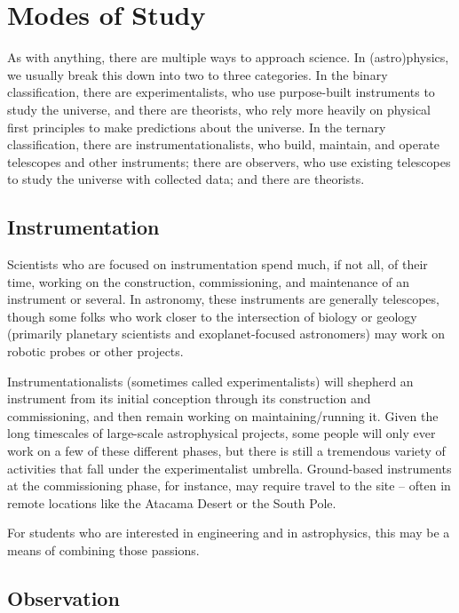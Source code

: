 \section{Modes of Study}

As with anything, there are multiple ways to approach science. In (astro)physics, we usually break this down into two to three categories. In the binary classification, there are experimentalists, who use purpose-built instruments to study the universe, and there are theorists, who rely more heavily on physical first principles to make predictions about the universe. In the ternary classification, there are instrumentationalists, who build, maintain, and operate telescopes and other instruments; there are observers, who use existing telescopes to study the universe with collected data; and there are theorists.

\subsection{Instrumentation}

Scientists who are focused on instrumentation spend much, if not all, of their time, working on the construction, commissioning, and maintenance of an instrument or several. In astronomy, these instruments are generally telescopes, though some folks who work closer to the intersection of biology or geology (primarily planetary scientists and exoplanet-focused astronomers) may work on robotic probes or other projects.

Instrumentationalists (sometimes called experimentalists) will shepherd an instrument from its initial conception through its construction and commissioning, and then remain working on maintaining/running it. Given the long timescales of large-scale astrophysical projects, some people will only ever work on a few of these different phases, but there is still a tremendous variety of activities that fall under the experimentalist umbrella. Ground-based instruments at the commissioning phase, for instance, may require travel to the site -- often in remote locations like the Atacama Desert or the South Pole.

For students who are interested in engineering and in astrophysics, this may be a means of combining those passions. 

\subsection{Observation}

